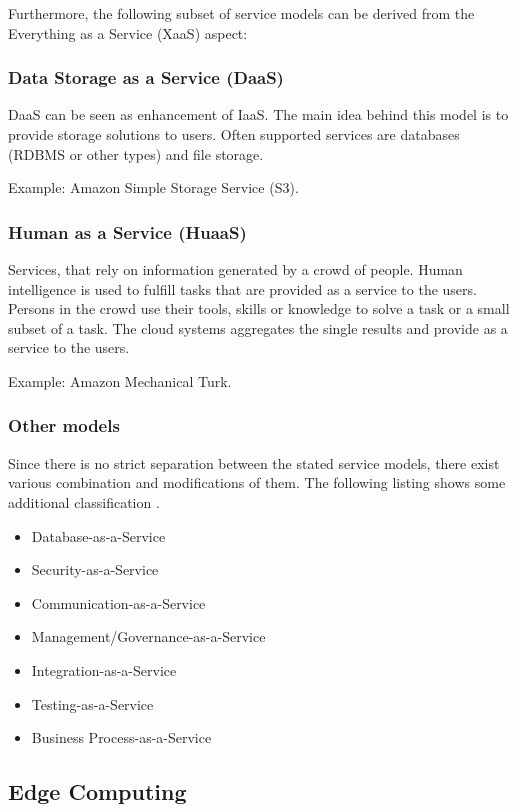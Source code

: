 

Furthermore, the following subset of service models can be derived from the Everything as a Service (XaaS) aspect:

\subsubsection{Data Storage as a Service (DaaS)}
DaaS can be seen as enhancement of IaaS. The main idea behind this model is to provide storage solutions to users. Often supported services are databases (RDBMS or other types) and file storage.
		
Example: Amazon Simple Storage Service (S3)\cite{issues}.

\subsubsection{Human as a Service (HuaaS)}
Services, that rely on information generated by a crowd of people. Human intelligence is used to fulfill tasks that are provided as a service to the users. Persons in the crowd use their tools, skills or knowledge to solve a task or a small subset of a task. The cloud systems aggregates the single results and provide as a service to the users.
	
Example: Amazon Mechanical Turk\cite{huaas}.

\subsubsection{Other models}
Since there is no strict separation between the stated service models, there exist various combination and modifications of them. The following listing shows some additional classification \cite{cloud_characteristics}.
\begin{itemize}
	\item Database-as-a-Service
	\item Security-as-a-Service
	\item Communication-as-a-Service
	\item Management/Governance-as-a-Service
	\item Integration-as-a-Service
	\item Testing-as-a-Service
	\item Business Process-as-a-Service
\end{itemize}

\subsection{Edge Computing}

